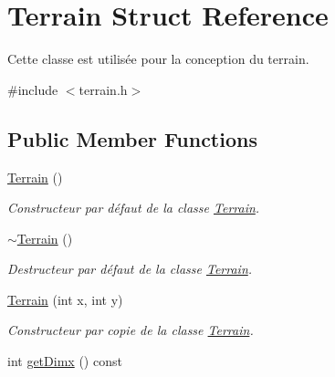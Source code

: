 \hypertarget{classTerrain}{}\section{Terrain Struct Reference}
\label{classTerrain}


Cette classe est utilisée pour la conception du terrain.  




{\ttfamily \#include $<$terrain.\+h$>$}

\subsection*{Public Member Functions}
\begin{DoxyCompactItemize}
\item 
\hyperlink{classTerrain_a7160a06ab07a86ed97d23374405e8ef6}{Terrain} ()\hypertarget{classTerrain_a7160a06ab07a86ed97d23374405e8ef6}{}\label{classTerrain_a7160a06ab07a86ed97d23374405e8ef6}

\begin{DoxyCompactList}\small\item\em Constructeur par défaut de la classe \hyperlink{classTerrain}{Terrain}. \end{DoxyCompactList}\item 
\hyperlink{classTerrain_a2f7f0a2aee54886324ccf48a6f321de0}{$\sim$\+Terrain} ()\hypertarget{classTerrain_a2f7f0a2aee54886324ccf48a6f321de0}{}\label{classTerrain_a2f7f0a2aee54886324ccf48a6f321de0}

\begin{DoxyCompactList}\small\item\em Destructeur par défaut de la classe \hyperlink{classTerrain}{Terrain}. \end{DoxyCompactList}\item 
\hyperlink{classTerrain_a592e2417235408aeca62743052c3d700}{Terrain} (int x, int y)\hypertarget{classTerrain_a592e2417235408aeca62743052c3d700}{}\label{classTerrain_a592e2417235408aeca62743052c3d700}

\begin{DoxyCompactList}\small\item\em Constructeur par copie de la classe \hyperlink{classTerrain}{Terrain}. \end{DoxyCompactList}\item 
int \hyperlink{classTerrain_a0694fde866e04fc407f5c52691562ee2}{get\+Dimx} () const \hypertarget{classTerrain_a0694fde866e04fc407f5c52691562ee2}{}\label{classTerrain_a0694fde866e04fc407f5c52691562ee2}


\end{DoxyCompactItemize}
